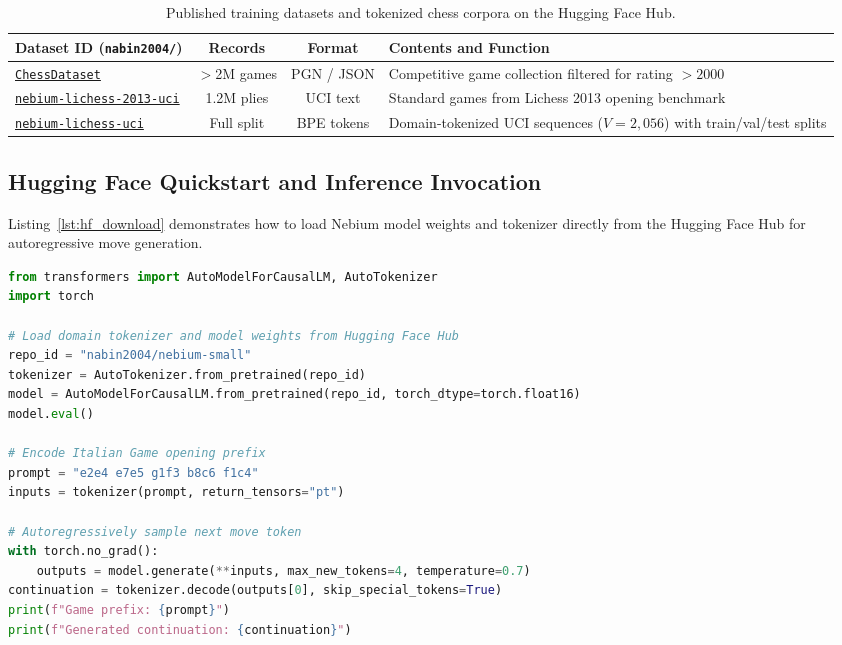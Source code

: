 \begin{table}[htbp]
\centering
\footnotesize
\caption{Published training datasets and tokenized chess corpora on the Hugging Face Hub.}
\label{tab:hf_datasets}
\begin{tabularx}{\linewidth}{@{} p{4.4cm} c c X @{}}
\toprule
\textbf{Dataset ID (\texttt{nabin2004/})} & \textbf{Records} & \textbf{Format} & \textbf{Contents and Function} \\
\midrule
\href{https://huggingface.co/datasets/nabin2004/ChessDataset}{\texttt{ChessDataset}} & $>$2M games & PGN / JSON & Competitive game collection filtered for rating $>2000$ \\
\href{https://huggingface.co/datasets/nabin2004/nebium-lichess-2013-uci}{\texttt{nebium-lichess-2013-uci}} & 1.2M plies & UCI text & Standard games from Lichess 2013 opening benchmark \\
\href{https://huggingface.co/datasets/nabin2004/nebium-lichess-uci}{\texttt{nebium-lichess-uci}} & Full split & BPE tokens & Domain-tokenized UCI sequences ($V=2,056$) with train/val/test splits \\
\bottomrule
\end{tabularx}
\end{table}

\subsection{Hugging Face Quickstart and Inference Invocation}
\label{sec:appendix_hf_quickstart}

Listing~\ref{lst:hf_download} demonstrates how to load Nebium model weights and tokenizer directly from the Hugging Face Hub for autoregressive move generation.

\begin{lstlisting}[language=Python, label={lst:hf_download}, caption={Loading Nebium-Small weights and tokenizer from the Hugging Face Hub.}]
from transformers import AutoModelForCausalLM, AutoTokenizer
import torch

# Load domain tokenizer and model weights from Hugging Face Hub
repo_id = "nabin2004/nebium-small"
tokenizer = AutoTokenizer.from_pretrained(repo_id)
model = AutoModelForCausalLM.from_pretrained(repo_id, torch_dtype=torch.float16)
model.eval()

# Encode Italian Game opening prefix
prompt = "e2e4 e7e5 g1f3 b8c6 f1c4"
inputs = tokenizer(prompt, return_tensors="pt")

# Autoregressively sample next move token
with torch.no_grad():
    outputs = model.generate(**inputs, max_new_tokens=4, temperature=0.7)
continuation = tokenizer.decode(outputs[0], skip_special_tokens=True)
print(f"Game prefix: {prompt}")
print(f"Generated continuation: {continuation}")
\end{lstlisting}

